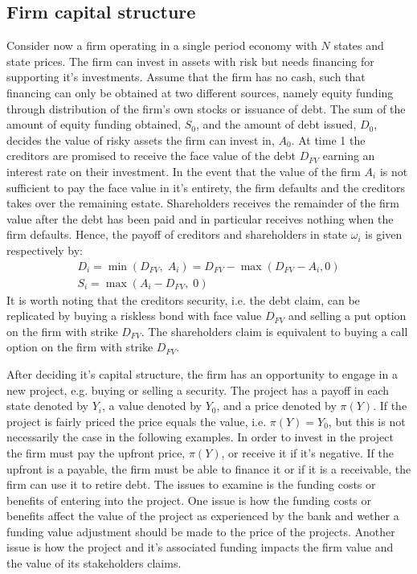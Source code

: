 \documentclass[../main.tex]{subfiles}
\begin{document}
    \subsection{Firm capital structure}
        Consider now a firm operating in a single period economy with $N$ states and state prices. The firm can invest in assets with risk but needs financing for supporting it's investments. Assume that the firm has no cash, such that financing can only be obtained at two different sources, namely equity funding through distribution of the firm's own stocks or issuance of debt. The sum of the amount of equity funding obtained, $S_{0}$, and the amount of debt issued, $D_{0}$, decides the value of risky assets the firm can invest in, $A_{0}$. At time 1 the creditors are promised to receive the face value of the debt $D_{FV}$ earning an interest rate on their investment. In the event that the value of the firm $A_{i}$ is not sufficient to pay the face value in it's entirety, the firm defaults and the creditors takes over the remaining estate. Shareholders receives the remainder of the firm value after the debt has been paid and in particular receives nothing when the firm defaults. Hence, the payoff of creditors and shareholders in state $\omega_{i}$ is given respectively by:
            \begin{gather}
                D_{i}
                    = \min\left(
                        D_{FV},\; A_{i}
                    \right)
                    = D_{FV} - \max\left(
                        D_{FV} - A_{i}, 0
                    \right) \label{eqn:legacy-creditor-payoff}\\
                S_{i}
                    = \max\left(
                        A_{i} - D_{FV},\; 0
                    \right)
            \end{gather}
        It is worth noting that the creditors security, i.e. the debt claim, can be replicated by buying a riskless bond with face value $D_{FV}$ and selling a put option on the firm with strike $D_{FV}$. The shareholders claim is equivalent to buying a call option on the firm with strike $D_{FV}$.

        After deciding it's capital structure, the firm has an opportunity to engage in a new project, e.g. buying or selling a security. The project has a payoff in each state denoted by $Y_{i}$, a value denoted by $Y_{0}$, and a price denoted by $\pi(Y)$. If the project is fairly priced the price equals the value, i.e. $\pi(Y) = Y_{0}$, but this is not necessarily the case in the following examples. In order to invest in the project the firm must pay the upfront price, $\pi(Y)$, or receive it if it's negative. If the upfront is a payable, the firm must be able to finance it or if it is a receivable, the firm can use it to retire debt. The issues to examine is the funding costs or benefits of entering into the project. One issue is how the funding costs or benefits affect the value of the project as experienced by the bank and wether a funding value adjustment should be made to the price of the projects. Another issue is how the project and it's associated funding impacts the firm value and the value of its stakeholders claims.
\end{document}
